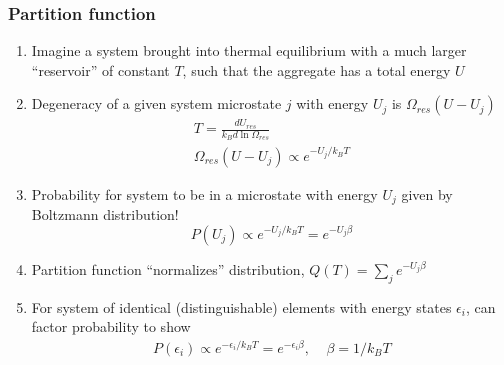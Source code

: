 \documentclass[11pt]{article}
\begin{document}
\subsubsection{Partition function}
\label{sec:org6069166}
\begin{enumerate}
\item Imagine a system brought into thermal equilibrium with a much larger ``reservoir'' of constant \(T\), such that the aggregate has a total energy \(U\)
\item Degeneracy of a given system microstate \(j\) with energy \(U_j\) is \(\Omega_{res}(U-U_j)\)
\begin{eqnarray*}
  T = \frac{dU_{res}}{k_Bd\ln\Omega_{res}} \\
  \Omega_{res}(U-U_j) \propto e^{-U_j/k_B T}
\end{eqnarray*}
\item Probability for system to be in a microstate with energy \(U_j\) given by Boltzmann distribution!
\begin{displaymath}
  P(U_j) \propto e^{-U_j/k_B T} = e^{-U_j \beta}
\end{displaymath}
\item Partition function ``normalizes'' distribution, \(Q(T) = \sum_j e^{-U_j \beta}\)
\item For system of identical (distinguishable) elements with energy states \(\epsilon_i\), can factor probability to show
\begin{eqnarray*}
  P(\epsilon_i) \propto e^{-\epsilon_i/k_B T} = e^{-\epsilon_i \beta},\
  \ \ \ \ \beta=1/k_BT
\end{eqnarray*}
\end{enumerate}
\end{document}
